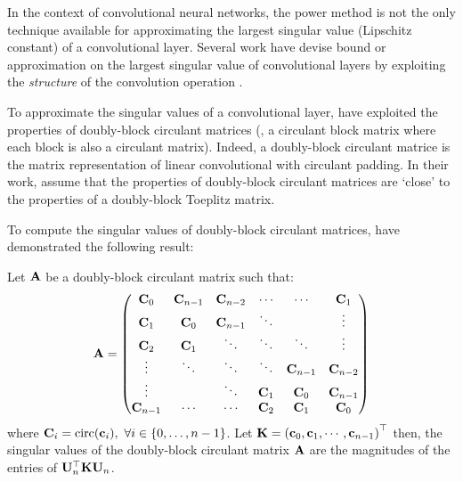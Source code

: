 \drawstar

\noindent
In the context of convolutional neural networks, the power method is not the only technique available for approximating the largest singular value (Lipschitz constant) of a convolutional layer.
Several work have devise bound or approximation on the largest singular value of convolutional layers by exploiting the \emph{structure} of the convolution operation \cite{sedghi2018singular,bibi2019deep,singla2019bounding}.








%


To approximate the singular values of a convolutional layer, \citet{sedghi2018singular} have exploited the properties of doubly-block circulant matrices (\ie, a circulant block matrix where each block is also a circulant matrix).
Indeed, a doubly-block circulant matrice is the matrix representation of linear convolutional with circulant padding.
In their work, \citet{sedghi2018singular} assume that the properties of doubly-block circulant matrices are `close' to the properties of a doubly-block Toeplitz matrix.

To compute the singular values of doubly-block circulant matrices, \citet{sedghi2018singular} have demonstrated the following result:
\begin{theorem}
  Let $\mathbf{A}$ be a doubly-block circulant matrix such that:
  \begin{equation*}
    \mathbf{A} = \begin{pmatrix}
      \mathbf{C}_0     & \mathbf{C}_{n-1} & \mathbf{C}_{n-2} & \cdots  & \cdots      & \mathbf{C}_1     \\
      \mathbf{C}_1     & \mathbf{C}_0     & \mathbf{C}_{n-1} & \ddots  &             & \vdots      \\
      \mathbf{C}_2     & \mathbf{C}_1     & \ddots      & \ddots  & \ddots      & \vdots      \\
      \vdots      & \ddots      & \ddots      & \ddots  & \mathbf{C}_{n-1} & \mathbf{C}_{n-2} \\
      \vdots      &             & \ddots      & \mathbf{C}_1 & \mathbf{C}_{0}   & \mathbf{C}_{n-1} \\
      \mathbf{C}_{n-1} & \cdots      & \cdots      & \mathbf{C}_2 & \mathbf{C}_{1}   & \mathbf{C}_0
    \end{pmatrix}
  \end{equation*}
  where $\mathbf{C}_i = \mathrm{circ}({\mathbf{c}_i}),\ \forall i \in \{0,\dots,n-1\}$.
  Let $\Kmat = \leftmat \cvec_0, \cvec_1, \cdots, \cvec_{n-1} \rightmat^\top$ then, the singular values of the doubly-block circulant matrix $\mathbf{A}$ are the magnitudes of the entries of $\mathbf{U}_n^\top \mathbf{K} \mathbf{U}_n$.
  \label{theorem:ch3-singular_values_doubly_block_circulant}
\end{theorem}

